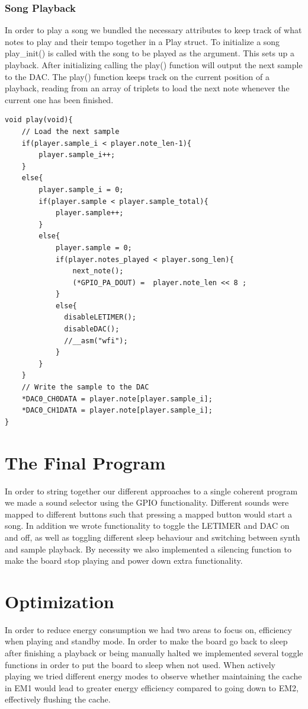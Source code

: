 \subsubsection{Song Playback}
In order to play a song we bundled the necessary attributes to keep track of what notes to play and their tempo together in a Play struct. To initialize a song play\_init() is called with the song to be played as the argument. This sets up a playback. After initializing calling the play() function will output the next sample to the DAC.
The play() function keeps track on the current position of a playback, reading from an array of triplets to load the next note whenever the current one has been finished.

\noindent\begin{minipage}{\textwidth}
\begin{lstlisting}
void play(void){
	// Load the next sample
	if(player.sample_i < player.note_len-1){			
		player.sample_i++;								
	}
	else{								
		player.sample_i = 0;
		if(player.sample < player.sample_total){
   			player.sample++;				
		}
		else{							
			player.sample = 0;
			if(player.notes_played < player.song_len){
				next_note();
				(*GPIO_PA_DOUT) =  player.note_len << 8 ;		
			}			 
			else{
			  disableLETIMER();
			  disableDAC();
			  //__asm("wfi");
			}
		}
	}
	// Write the sample to the DAC
	*DAC0_CH0DATA = player.note[player.sample_i];
	*DAC0_CH1DATA = player.note[player.sample_i];
}
\end{lstlisting}
\end{minipage}

\section{The Final Program}
In order to string together our different approaches to a single coherent program we made a sound selector using the GPIO functionality. Different sounds were mapped to different buttons such that pressing a mapped button would start a song. In addition we wrote functionality to toggle the LETIMER and DAC on and off, as well as toggling different sleep behaviour and switching between synth and sample playback. By necessity we also implemented a silencing function to make the board stop playing and power down extra functionality.

\section{Optimization}
In order to reduce energy consumption we had two areas to focus on, efficiency when playing and standby mode. In order to make the board go back to sleep after finishing a playback or being manually halted we implemented several toggle functions in order to put the board to sleep when not used. When actively playing we tried different energy modes to observe whether maintaining the cache in EM1 would lead to greater energy efficiency compared to going down to EM2, effectively flushing the cache.

